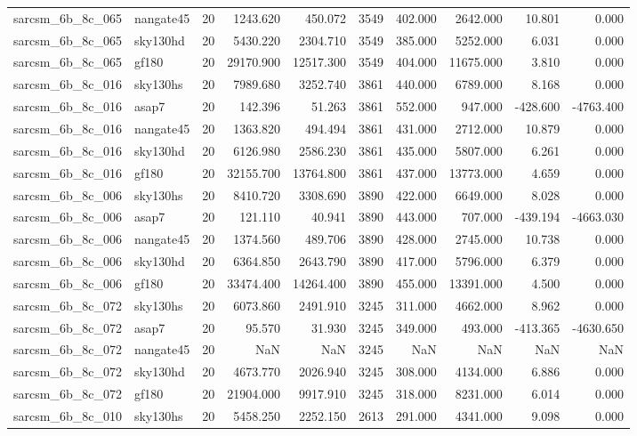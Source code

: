 \begin{tabular}{llrrrrrrrr}
sarcsm\_6b\_8c\_065 & nangate45 & 20 & 1243.620 & 450.072 & 3549 & 402.000 & 2642.000 & 10.801 & 0.000 \\
sarcsm\_6b\_8c\_065 & sky130hd & 20 & 5430.220 & 2304.710 & 3549 & 385.000 & 5252.000 & 6.031 & 0.000 \\
sarcsm\_6b\_8c\_065 & gf180 & 20 & 29170.900 & 12517.300 & 3549 & 404.000 & 11675.000 & 3.810 & 0.000 \\
sarcsm\_6b\_8c\_016 & sky130hs & 20 & 7989.680 & 3252.740 & 3861 & 440.000 & 6789.000 & 8.168 & 0.000 \\
sarcsm\_6b\_8c\_016 & asap7 & 20 & 142.396 & 51.263 & 3861 & 552.000 & 947.000 & -428.600 & -4763.400 \\
sarcsm\_6b\_8c\_016 & nangate45 & 20 & 1363.820 & 494.494 & 3861 & 431.000 & 2712.000 & 10.879 & 0.000 \\
sarcsm\_6b\_8c\_016 & sky130hd & 20 & 6126.980 & 2586.230 & 3861 & 435.000 & 5807.000 & 6.261 & 0.000 \\
sarcsm\_6b\_8c\_016 & gf180 & 20 & 32155.700 & 13764.800 & 3861 & 437.000 & 13773.000 & 4.659 & 0.000 \\
sarcsm\_6b\_8c\_006 & sky130hs & 20 & 8410.720 & 3308.690 & 3890 & 422.000 & 6649.000 & 8.028 & 0.000 \\
sarcsm\_6b\_8c\_006 & asap7 & 20 & 121.110 & 40.941 & 3890 & 443.000 & 707.000 & -439.194 & -4663.030 \\
sarcsm\_6b\_8c\_006 & nangate45 & 20 & 1374.560 & 489.706 & 3890 & 428.000 & 2745.000 & 10.738 & 0.000 \\
sarcsm\_6b\_8c\_006 & sky130hd & 20 & 6364.850 & 2643.790 & 3890 & 417.000 & 5796.000 & 6.379 & 0.000 \\
sarcsm\_6b\_8c\_006 & gf180 & 20 & 33474.400 & 14264.400 & 3890 & 455.000 & 13391.000 & 4.500 & 0.000 \\
sarcsm\_6b\_8c\_072 & sky130hs & 20 & 6073.860 & 2491.910 & 3245 & 311.000 & 4662.000 & 8.962 & 0.000 \\
sarcsm\_6b\_8c\_072 & asap7 & 20 & 95.570 & 31.930 & 3245 & 349.000 & 493.000 & -413.365 & -4630.650 \\
sarcsm\_6b\_8c\_072 & nangate45 & 20 & NaN & NaN & 3245 & NaN & NaN & NaN & NaN \\
sarcsm\_6b\_8c\_072 & sky130hd & 20 & 4673.770 & 2026.940 & 3245 & 308.000 & 4134.000 & 6.886 & 0.000 \\
sarcsm\_6b\_8c\_072 & gf180 & 20 & 21904.000 & 9917.910 & 3245 & 318.000 & 8231.000 & 6.014 & 0.000 \\
sarcsm\_6b\_8c\_010 & sky130hs & 20 & 5458.250 & 2252.150 & 2613 & 291.000 & 4341.000 & 9.098 & 0.000 \\

\end{tabular}
